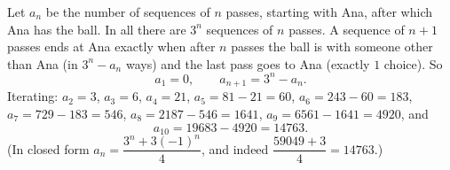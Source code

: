 Let $a_n$ be the number of sequences of $n$ passes, starting with Ana, after which Ana has the ball. In all there are $3^{n}$ sequences of $n$ passes. A sequence of $n+1$ passes ends at Ana exactly when after $n$ passes the ball is with someone other than Ana (in $3^n-a_n$ ways) and the last pass goes to Ana (exactly $1$ choice). So
\[
a_1=0,\qquad a_{n+1}=3^n-a_n .
\]
Iterating: $a_2=3$, $a_3=6$, $a_4=21$, $a_5=81-21=60$, $a_6=243-60=183$, $a_7=729-183=546$, $a_8=2187-546=1641$, $a_9=6561-1641=4920$, and
\[
a_{10}=19683-4920=\boxed{14763}.
\]
(In closed form $a_n=\dfrac{3^n+3(-1)^n}{4}$, and indeed $\dfrac{59049+3}{4}=14763$.)
